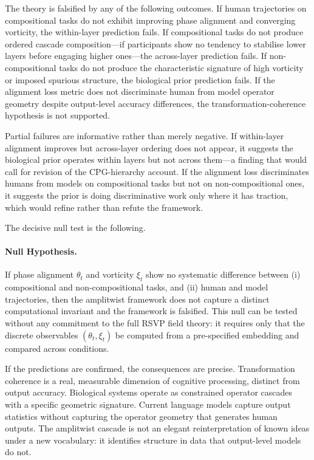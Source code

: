 \documentclass[12pt, a4paper]{article}
\theoremstyle{remark}
\theoremstyle{definition}
\begin{document}
The theory is falsified by any of the following outcomes.  If human trajectories on
compositional tasks do not exhibit improving phase alignment and converging vorticity, the
within-layer prediction fails.  If compositional tasks do not produce ordered cascade
composition---if participants show no tendency to stabilise lower layers before engaging
higher ones---the across-layer prediction fails.  If non-compositional tasks do not produce
the characteristic signature of high vorticity or imposed spurious structure, the
biological prior prediction fails.  If the alignment loss metric does not discriminate
human from model operator geometry despite output-level accuracy differences, the
transformation-coherence hypothesis is not supported.

Partial failures are informative rather than merely negative.  If within-layer alignment
improves but across-layer ordering does not appear, it suggests the biological prior
operates within layers but not across them---a finding that would call for revision of the
CPG-hierarchy account.  If the alignment loss discriminates humans from models on
compositional tasks but not on non-compositional ones, it suggests the prior is doing
discriminative work only where it has traction, which would refine rather than refute the
framework.

The decisive null test is the following.

\paragraph{Null Hypothesis.} If phase alignment $\theta_t$ and vorticity $\xi_t$ show no
systematic difference between (i) compositional and non-compositional tasks, and (ii)
human and model trajectories, then the amplitwist framework does not capture a distinct
computational invariant and the framework is falsified.  This null can be tested without
any commitment to the full RSVP field theory: it requires only that the discrete
observables $(\theta_t, \xi_t)$ be computed from a pre-specified embedding and compared
across conditions.

If the predictions are confirmed, the consequences are precise.  Transformation coherence
is a real, measurable dimension of cognitive processing, distinct from output accuracy.
Biological systems operate as constrained operator cascades with a specific geometric
signature.  Current language models capture output statistics without capturing the
operator geometry that generates human outputs.  The amplitwist cascade is not an elegant
reinterpretation of known ideas under a new vocabulary: it identifies structure in data
that output-level models do not.
\end{document}
